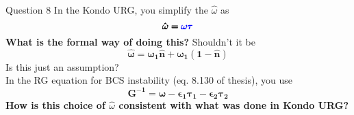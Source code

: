 \documentclass[12pt,aspectratio=169]{beamer}
\newcommand{\qs}[1]{\textbf{\textcolor{bottlegreen}{#1}}}
\begin{document}
\begin{frame}{Question 8}
	In the Kondo URG, you simplify the \(\hat \omega\) as 
\begin{equation*}
	\pmb{\hat \omega = \textcolor{blue}{\omega \tau}}
\end{equation*}
\qs{What is the formal way of doing this?} Shouldn't it be 
\begin{equation*}
	\pmb{\hat \omega = \omega_1 \hat n + \omega_1 (1 - \hat n)}
\end{equation*}
Is this just an assumption?\\[10pt]
In the RG equation for BCS instability (eq. 8.130 of thesis), you use 
\begin{equation*}
	\pmb{G^{-1} = \omega - \epsilon_1 \tau_1 - \epsilon_2 \tau_2}
\end{equation*}
\qs{How is this choice of \(\hat \omega\) consistent with what was done in Kondo URG?}

\end{frame}
\end{document}
